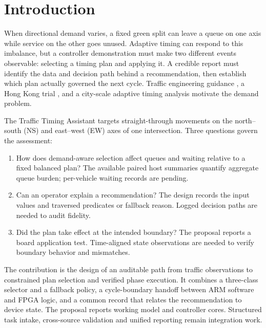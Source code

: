 \section{Introduction}
When directional demand varies, a fixed green split can leave a queue on one axis while service on the other goes unused. Adaptive timing can respond to this imbalance, but a controller demonstration must make two different events observable: selecting a timing plan and applying it. A credible report must identify the data and decision path behind a recommendation, then establish which plan actually governed the next cycle. Traffic engineering guidance \cite{koonce}, a Hong Kong trial \cite{hk}, and a city-scale adaptive timing analysis \cite{wu} motivate the demand problem.

The Traffic Timing Assistant targets straight-through movements on the north--south (NS) and east--west (EW) axes of one intersection. Three questions govern the assessment:
\begin{enumerate}
\item How does demand-aware selection affect queues and waiting relative to a fixed balanced plan? The available paired host summaries quantify aggregate queue burden; per-vehicle waiting records are pending.
\item Can an operator explain a recommendation? The design records the input values and traversed predicates or fallback reason. Logged decision paths are needed to audit fidelity.
\item Did the plan take effect at the intended boundary? The proposal reports a board application test. Time-aligned state observations are needed to verify boundary behavior and mismatches.
\end{enumerate}

The contribution is the design of an auditable path from traffic observations to constrained plan selection and verified phase execution. It combines a three-class selector and a fallback policy, a cycle-boundary handoff between ARM software and FPGA logic, and a common record that relates the recommendation to device state. The proposal reports working model and controller cores. Structured task intake, cross-source validation and unified reporting remain integration work.
